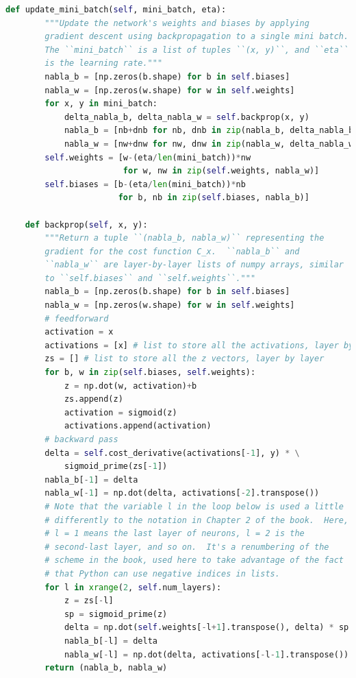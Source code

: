 \begin{lstlisting}[language=Python]
    def update_mini_batch(self, mini_batch, eta):
        """Update the network's weights and biases by applying
        gradient descent using backpropagation to a single mini batch.
        The ``mini_batch`` is a list of tuples ``(x, y)``, and ``eta``
        is the learning rate."""
        nabla_b = [np.zeros(b.shape) for b in self.biases]
        nabla_w = [np.zeros(w.shape) for w in self.weights]
        for x, y in mini_batch:
            delta_nabla_b, delta_nabla_w = self.backprop(x, y)
            nabla_b = [nb+dnb for nb, dnb in zip(nabla_b, delta_nabla_b)]
            nabla_w = [nw+dnw for nw, dnw in zip(nabla_w, delta_nabla_w)]
        self.weights = [w-(eta/len(mini_batch))*nw
                        for w, nw in zip(self.weights, nabla_w)]
        self.biases = [b-(eta/len(mini_batch))*nb
                       for b, nb in zip(self.biases, nabla_b)]

    def backprop(self, x, y):
        """Return a tuple ``(nabla_b, nabla_w)`` representing the
        gradient for the cost function C_x.  ``nabla_b`` and
        ``nabla_w`` are layer-by-layer lists of numpy arrays, similar
        to ``self.biases`` and ``self.weights``."""
        nabla_b = [np.zeros(b.shape) for b in self.biases]
        nabla_w = [np.zeros(w.shape) for w in self.weights]
        # feedforward
        activation = x
        activations = [x] # list to store all the activations, layer by layer
        zs = [] # list to store all the z vectors, layer by layer
        for b, w in zip(self.biases, self.weights):
            z = np.dot(w, activation)+b
            zs.append(z)
            activation = sigmoid(z)
            activations.append(activation)
        # backward pass
        delta = self.cost_derivative(activations[-1], y) * \
            sigmoid_prime(zs[-1])
        nabla_b[-1] = delta
        nabla_w[-1] = np.dot(delta, activations[-2].transpose())
        # Note that the variable l in the loop below is used a little
        # differently to the notation in Chapter 2 of the book.  Here,
        # l = 1 means the last layer of neurons, l = 2 is the
        # second-last layer, and so on.  It's a renumbering of the
        # scheme in the book, used here to take advantage of the fact
        # that Python can use negative indices in lists.
        for l in xrange(2, self.num_layers):
            z = zs[-l]
            sp = sigmoid_prime(z)
            delta = np.dot(self.weights[-l+1].transpose(), delta) * sp
            nabla_b[-l] = delta
            nabla_w[-l] = np.dot(delta, activations[-l-1].transpose())
        return (nabla_b, nabla_w)


\end{lstlisting}
